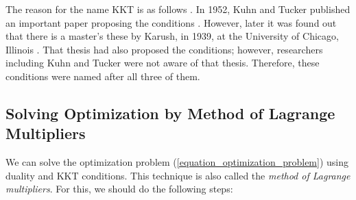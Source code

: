 \documentclass[lang=cn,10pt]{gorgeousnbook}
\numberwithin{equation}{section}%
\numberwithin{figure}{section}%
\begin{document}
The reason for the name KKT is as follows \cite{kjeldsen2000contextualized}. In 1952, Kuhn and Tucker published an important paper proposing the conditions \cite{kuhn1951nonlinear}. However, later it was found out that there is a master's these by Karush, in 1939, at the University of Chicago, Illinois \cite{karush1939minima}. That thesis had also proposed the conditions; however, researchers including Kuhn and Tucker were not aware of that thesis. Therefore, these conditions were named after all three of them. 

\subsection{Solving Optimization by Method of Lagrange Multipliers}\label{section_method_of_multipliers}

We can solve the optimization problem (\ref{equation_optimization_problem}) using duality and KKT conditions. 
This technique is also called the \textit{method of Lagrange multipliers}. 
For this, we should do the following steps:
\end{document}
